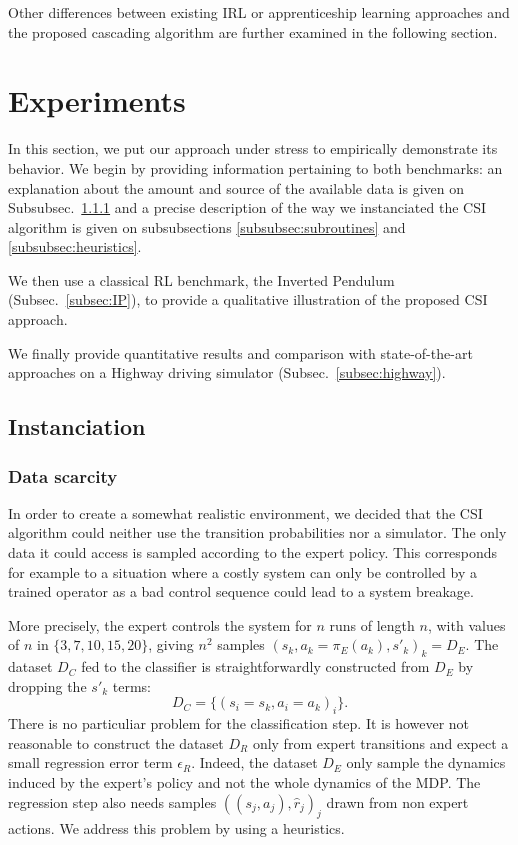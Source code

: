 \documentclass[smallextended]{svjour3}
\begin{document}
Other differences between existing IRL or apprenticeship learning approaches and the proposed cascading algorithm are further examined in the following section.

\section{Experiments}
\label{sec:experiments}
In this section, we put our approach under stress to empirically demonstrate its behavior. We begin by providing information pertaining to both benchmarks: an explanation about the amount and source of the available data is given on Subsubsec.~\ref{subsubsec:data} and a precise description of the way we instanciated the CSI algorithm is given on subsubsections \ref{subsubsec:subroutines} and \ref{subsubsec:heuristics}. 

We then use a classical RL benchmark, the Inverted Pendulum (Subsec.~\ref{subsec:IP}), to provide a qualitative illustration of the proposed CSI approach.

We finally provide quantitative results and comparison with state-of-the-art approaches on a Highway driving simulator (Subsec.~\ref{subsec:highway}).
\subsection{Instanciation}
\label{subsec:instanciation}
\subsubsection{Data scarcity}
\label{subsubsec:data}
In order to create a somewhat realistic environment, we decided that the CSI algorithm could neither use the transition probabilities nor a simulator. The only data it could access is sampled according to the expert policy. This corresponds for example to a situation where a costly system can only be controlled by a trained operator as a bad control sequence could lead to a system breakage.

More precisely, the expert controls the system for $n$ runs of length $n$, with values of $n$ in $\{3,7,10,15,20\}$, giving $n^2$ samples $(s_k,a_k=\pi_E(a_k),s'_k)_k = D_E$. The dataset $D_C$ fed to the classifier is straightforwardly constructed from $D_E$ by dropping the $s'_k$ terms:
\begin{equation}
  D_C = \{(s_i = s_k,a_i=a_k)_i\}.
\end{equation}
There is no particuliar problem for the classification step. It is however not reasonable to construct the dataset $D_R$ only from expert transitions and expect a small regression error term $\epsilon_R$. Indeed, the dataset $D_E$ only sample the dynamics induced by the expert's policy and not the whole dynamics of the MDP. The regression step also needs samples $((s_j,a_j),\hat r_j)_j$ drawn from non expert actions. We address this problem by using a heuristics.
\end{document}
